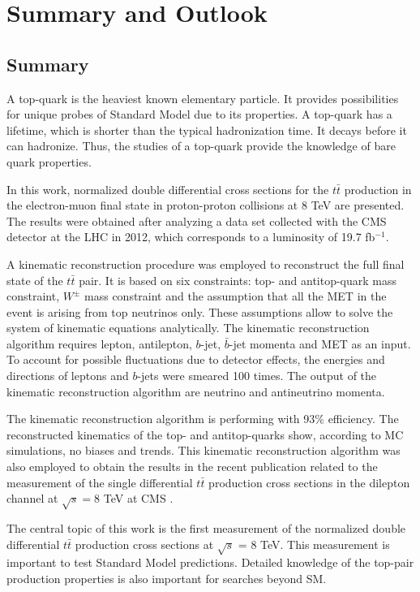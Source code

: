 \chapter{Summary and Outlook}\label{chapt:conc}

\section{Summary}

A top-quark is the heaviest known elementary particle. It provides possibilities for unique probes of Standard
Model due to its properties. A top-quark has a lifetime, which is shorter than the typical hadronization time.
It decays before it can hadronize. Thus, the studies of a top-quark provide the knowledge of bare quark 
properties.

In this work, normalized double differential cross sections for the $t\bar{t}$ production in the electron-muon final state 
in proton-proton collisions at 8 TeV are presented.
The results were obtained after analyzing a data set collected with the CMS detector at the LHC in 2012, which corresponds to a 
luminosity of 19.7 fb$^{-1}$.

A kinematic reconstruction procedure was employed to reconstruct the full final state of the $t\bar{t}$ pair. It is based on six constraints:
top- and antitop-quark mass constraint, $W^{\pm}$ mass constraint and the assumption that all the MET in the event is arising
from top neutrinos only. These assumptions allow to solve the system of kinematic equations analytically. The kinematic reconstruction
algorithm requires lepton, antilepton, $b$-jet, $\bar{b}$-jet momenta and MET as an input. To account for possible fluctuations due 
to detector effects, the energies and directions of leptons and $b$-jets were smeared 100 times. The output of the kinematic reconstruction
algorithm are neutrino and antineutrino momenta.

The kinematic reconstruction algorithm is performing with 93\% efficiency. The reconstructed kinematics of the top- and antitop-quarks
show, according to MC simulations, no biases and trends. This kinematic reconstruction algorithm was also employed to obtain the 
results in the recent publication related
to the measurement of the single differential $t\bar{t}$ production cross sections in the dilepton channel at $\sqrt{s} = $8 TeV
at CMS \cite{Khachatryan:2015oqa}.

The central topic of this work is the first measurement of the normalized double differential $t\bar{t}$ production cross 
sections at $\sqrt{s}$ = 8 TeV. This measurement is important to test Standard Model predictions. Detailed knowledge of the 
top-pair production properties is also important for searches beyond SM.

